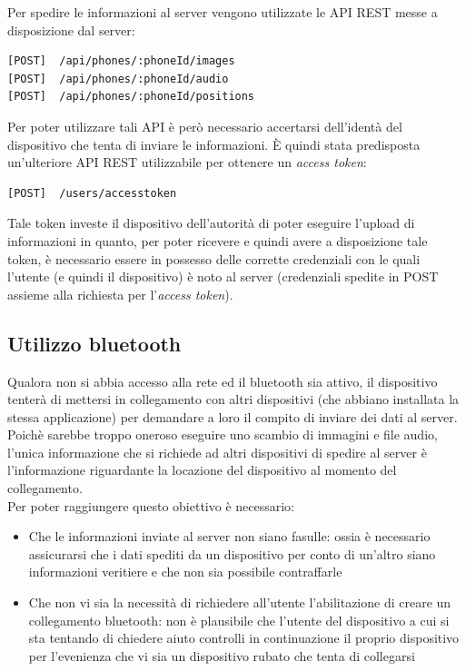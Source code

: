 Per spedire le informazioni al server vengono utilizzate le API REST messe a disposizione dal server:
\begin{lstlisting}[caption=API REST utilizzate per spedire dati al server]
[POST]	/api/phones/:phoneId/images
[POST] 	/api/phones/:phoneId/audio
[POST]  /api/phones/:phoneId/positions
\end{lstlisting}
Per poter utilizzare tali API è però necessario accertarsi dell'identà del dispositivo che tenta di inviare le informazioni. \`E quindi stata predisposta un'ulteriore API REST utilizzabile per ottenere un \textit{access token}:
\begin{lstlisting}[caption=API REST utilizzate per identificarsi e ricevere l'access token]
[POST]	/users/accesstoken
\end{lstlisting}
Tale token investe il dispositivo dell'autorità di poter eseguire l'upload di informazioni in quanto, per poter ricevere e quindi avere a disposizione tale token, è necessario essere in possesso delle corrette credenziali con le quali l'utente (e quindi il dispositivo) è noto al server (credenziali spedite in POST assieme alla richiesta per l'\textit{access token}).

\subsection{Utilizzo bluetooth}
Qualora non si abbia accesso alla rete ed il bluetooth sia attivo, il dispositivo tenterà di mettersi in collegamento con altri dispositivi (che abbiano installata la stessa applicazione) per demandare a loro il compito di inviare dei dati al server. Poichè sarebbe troppo oneroso eseguire uno scambio di immagini e file audio, l'unica informazione che si richiede ad altri dispositivi di spedire al server è l'informazione riguardante la locazione del dispositivo al momento del collegamento.\\
Per poter raggiungere questo obiettivo è necessario:
\begin{itemize}
  \item Che le informazioni inviate al server non siano fasulle: ossia è necessario assicurarsi che i dati spediti da un dispositivo per conto di un'altro siano informazioni veritiere e che non sia possibile contraffarle
  \item Che non vi sia la necessità di richiedere all'utente l'abilitazione di creare un collegamento bluetooth: non è plausibile che l'utente del dispositivo a cui si sta tentando di chiedere aiuto controlli in continuazione il proprio dispositivo per l'evenienza che vi sia un dispositivo rubato che tenta di collegarsi
\end{itemize}

